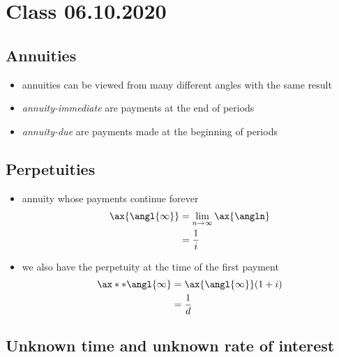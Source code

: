\documentclass[../00_main.tex]{subfiles}
\begin{document}
\section{Class 06.10.2020}

\subsection{Annuities}

\begin{itemize}
    \item annuities can be viewed from many different angles with the same
        result
    \item \textit{annuity-immediate} are payments at the end of periods
    \item \textit{annuity-due} are payments made at the beginning of periods
\end{itemize}

\subsection{Perpetuities}

\begin{itemize}
    \item annuity whose payments continue forever
        \begin{equation}\nonumber
            \begin{aligned}
                \ax{\angl{\infty}} &= \lim_{n\rightarrow\infty} \ax{\angln}  \\
                &= \frac{1}{i}
            \end{aligned}
        \end{equation}
    \item we also have the perpetuity at the time of the first payment
        \begin{equation}\nonumber
            \begin{aligned}
                \ax**{\angl{\infty}} &= \ax{\angl{\infty}}(1+i) \\
                &= \frac{1}{d}
            \end{aligned}
        \end{equation}
\end{itemize}

\subsection{Unknown time and unknown rate of interest}
\end{document}
